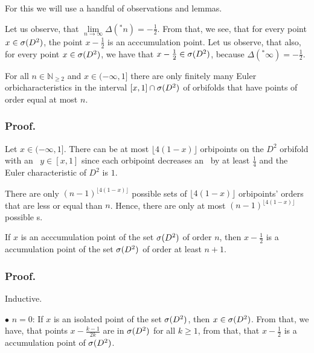 For this we will use  
a handful of observations and lemmas. 
\begin{observation}\label{accumulation_points_are_in_the_spectrum}
Let us observe, that $\lim\limits_{n \to \infty} \Delta(^\ast n) = -\frac{1}{2}$. From that, 
we see, 
that for every point $x \in {{\sigma}(D^2)}$, the point $x - \frac{1}{2}$ is an acccumulation point. 
Let us observe, that also, for every point $x \in {{\sigma}(D^2)}$, we have that $x - \frac{1}{2} 
\in {{\sigma}(D^2)}$, 
because $\Delta(^\ast \infty) = -\frac{1}{2}$. 
\end{observation}

\begin{lemma}\label{finiteness_lemma}
For all $n \in \mathbb{N}_{\geq 2}$ and $x \in (-\infty, 1]$ there are only finitely 
many Euler orbicharacteristics
in the interval $[x,1] \cap {{\sigma}(D^2)}$ of orbifolds that have points of order equal 
at most $n$. 
\end{lemma}
\subsubsection{Proof.} 
Let $x \in (-\infty, 1]$. There can be at most $\lfloor 4(1-x) \rfloor$ orbipoints on the 
$D^2$ orbifold 
with an \Eoc\ $y \in [x,1]$ since each orbipoint decreases an \Eoc\ by at least $\frac{1}{4}$ 
and the Euler characteristic of $D^2$ is $1$. 

There are only $(n-1)^{\lfloor 4(1-x) \rfloor}$ possible sets of $\lfloor 4(1-x) \rfloor$ 
orbipoints' orders that are less or equal than $n$. Hence, there are only at most 
$(n-1)^{\lfloor 4(1-x) \rfloor}$ possible \Eoc s.


\begin{lemma}\label{first_order_lemma}
If $x$ is an acccumulation point of the set ${{\sigma}(D^2)}$ of order $n$, then $x-\frac{1}{2}$ is a
 accumulation point of the set ${{\sigma}(D^2)}$ of order at least $n+1$. 
\end{lemma}
\subsubsection{Proof.}
Inductive. 

$\bullet$ $n = 0$: If $x$ is an isolated point of the set ${{\sigma}(D^2)}$, then $x \in {{\sigma}(D^2)}$. 
From that, we 
have, that points $x - \frac{k-1}{2k}$ are in ${{\sigma}(D^2)}$ for all $k \geq 1$, from that, that 
$x-\frac{1}{2}$ is a 
accumulation point of ${{\sigma}(D^2)}$. 

